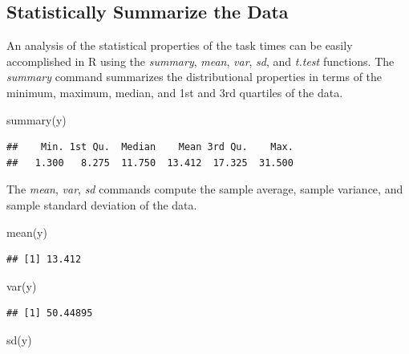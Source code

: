\documentclass[
]{book}
\newenvironment{Shaded}{\begin{snugshade}}{\end{snugshade}}
\newcommand{\FunctionTok}[1]{\textcolor[rgb]{0.00,0.00,0.00}{#1}}
\newcommand{\NormalTok}[1]{#1}
\theoremstyle{definition}
\theoremstyle{definition}
\theoremstyle{definition}
\theoremstyle{definition}
\theoremstyle{remark}
\begin{document}
\hypertarget{app:idm:subsec:statsdata}{%
\subsection{Statistically Summarize the Data}\label{app:idm:subsec:statsdata}}

An analysis of the statistical properties of the task times can be
easily accomplished in R using the \emph{summary}, \emph{mean}, \emph{var}, \emph{sd}, and
\emph{t.test} functions. The \emph{summary} command summarizes the distributional properties in terms
of the minimum, maximum, median, and 1st and 3rd quartiles of the data.

\begin{Shaded}
\begin{Highlighting}[]
\FunctionTok{summary}\NormalTok{(y)}
\end{Highlighting}
\end{Shaded}

\begin{verbatim}
##    Min. 1st Qu.  Median    Mean 3rd Qu.    Max. 
##   1.300   8.275  11.750  13.412  17.325  31.500
\end{verbatim}

The \emph{mean}, \emph{var}, \emph{sd} commands compute the sample average, sample
variance, and sample standard deviation of the data.

\begin{Shaded}
\begin{Highlighting}[]
\FunctionTok{mean}\NormalTok{(y)}
\end{Highlighting}
\end{Shaded}

\begin{verbatim}
## [1] 13.412
\end{verbatim}

\begin{Shaded}
\begin{Highlighting}[]
\FunctionTok{var}\NormalTok{(y)}
\end{Highlighting}
\end{Shaded}

\begin{verbatim}
## [1] 50.44895
\end{verbatim}

\begin{Shaded}
\begin{Highlighting}[]
\FunctionTok{sd}\NormalTok{(y)}
\end{Highlighting}
\end{Shaded}
\end{document}
